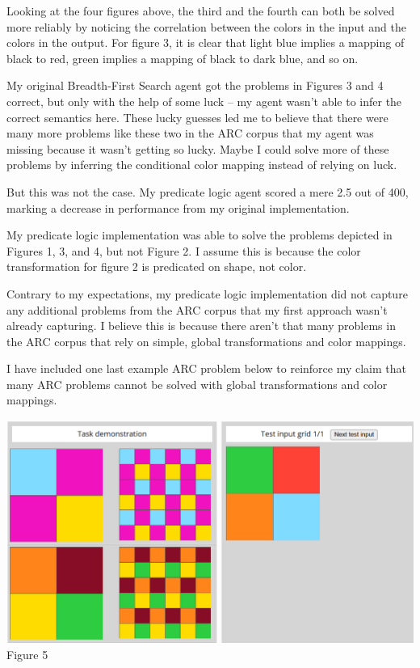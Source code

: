 \documentclass[letterpaper]{article} %
\begin{document}
Looking at the four figures above, the third and the fourth can both be solved more reliably by noticing the correlation between the colors in the input and the colors in the output. For figure 3, it is clear that light blue implies a mapping of black to red, green implies a mapping of black to dark blue, and so on.

\bigskip

My original Breadth-First Search agent got the problems in Figures 3 and 4 correct, but only with the help of some luck -- my agent wasn't able to infer the correct semantics here. These lucky guesses led me to believe that there were many more problems like these two in the ARC corpus that my agent was missing because it wasn't getting so lucky. Maybe I could solve more of these problems by inferring the conditional color mapping instead of relying on luck.

\bigskip

But this was not the case. My predicate logic agent scored a mere 2.5 out of 400, marking a decrease in performance from my original implementation.

\bigskip

My predicate logic implementation was able to solve the problems depicted in Figures 1, 3, and 4, but not Figure 2. I assume this is because the color transformation for figure 2 is predicated on shape, not color.

\bigskip

Contrary to my expectations, my predicate logic implementation did not capture any additional problems from the ARC corpus that my first approach wasn't already capturing. I believe this is because there aren't that many problems in the ARC corpus that rely on simple, global transformations and color mappings.

\bigskip

I have included one last example ARC problem below to reinforce my claim that many ARC problems cannot be solved with global transformations and color mappings. 

\begin{center}
    \includegraphics[scale=0.28]{unsolved.png}\\
    Figure 5
\end{center}
\end{document}
